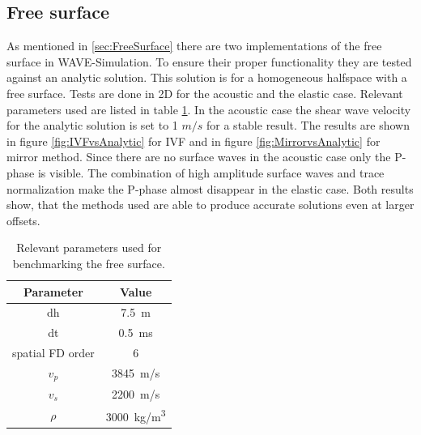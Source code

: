 \documentclass[pdftex,a4paper,parskip,listof=totoc,bibliography=totoc,onehalfspacing,12pt]{scrreprt}
\begin{document}
\subsection{Free surface}

As mentioned in \ref{sec:FreeSurface} there are two implementations of the free surface in WAVE-Simulation. To ensure their proper functionality they are tested against an analytic solution. This solution is for a homogeneous halfspace with a free surface. Tests are done in 2D for the acoustic and the elastic case. Relevant parameters used are listed in table \ref{tab:freeSurfaceBenchmark}. In the acoustic case the shear wave velocity for the analytic solution is set to 1 $m/s$ for a stable result. The results are shown in figure \ref{fig:IVFvsAnalytic} for IVF and in figure \ref{fig:MirrorvsAnalytic} for mirror method. Since there are no surface waves in the acoustic case only the P-phase is visible. The combination of high amplitude surface waves and trace normalization make the P-phase almost disappear in the elastic case. Both results show, that the methods used are able to produce accurate solutions even at larger offsets.

\begin{table}[]
\centering
\caption{Relevant parameters used for benchmarking the free surface.}
\label{tab:freeSurfaceBenchmark}
\begin{tabular}{@{}cc@{}}
\toprule
Parameter        & Value  \\ \midrule
dh               & \SI{7.5}{\meter}    \\
dt               & \SI{0.5}{\milli\second} \\
spatial FD order & 6      \\
$v_p$               & \SI{3845}{m/s}   \\
$v_s$               & \SI{2200}{m/s}   \\
$\rho$              & \SI{3000}{kg/m^3}  \\ \bottomrule
\end{tabular}
\end{table}
\end{document}
